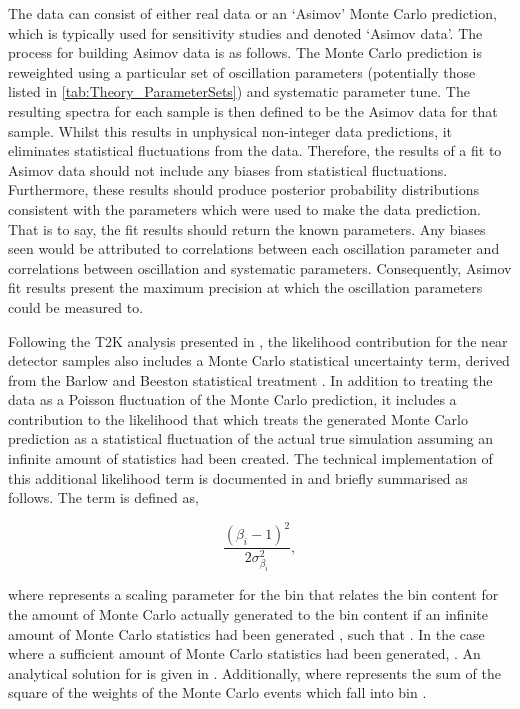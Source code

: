 The data can consist of either real data or an `Asimov' Monte Carlo prediction, which is typically used for sensitivity studies and denoted `Asimov data'. The process for building Asimov data is as follows. The Monte Carlo prediction is reweighted using a particular set of oscillation parameters (potentially those listed in \autoref{tab:Theory_ParameterSets}) and systematic parameter tune. The resulting spectra for each sample is then defined to be the Asimov data for that sample. Whilst this results in unphysical non-integer data predictions, it eliminates statistical fluctuations from the data. Therefore, the results of a fit to Asimov data should not include any biases from statistical fluctuations. Furthermore, these results should produce posterior probability distributions consistent with the parameters which were used to make the data prediction. That is to say, the fit results should return the known parameters. Any biases seen would be attributed to correlations between each oscillation parameter and correlations between oscillation and systematic parameters. Consequently, Asimov fit results present the maximum precision at which the oscillation parameters could be measured to.

Following the T2K analysis presented in \cite{Dunne2020-uf}, the likelihood contribution for the near detector samples also includes a Monte Carlo statistical uncertainty term, derived from the Barlow and Beeston statistical treatment \cite{Barlow1993-cc, Conway2011-go}. In addition to treating the data as a Poisson fluctuation of the Monte Carlo prediction, it includes a contribution to the likelihood that which treats the generated Monte Carlo prediction as a statistical fluctuation of the actual true simulation assuming an infinite amount of statistics had been created. The technical implementation of this additional likelihood term is documented in \cite{t2k_tn_395} and briefly summarised as follows. The term is defined as,

\begin{equation}
  \frac{(\beta_{i}-1)^{2}}{2\sigma^{2}_{\beta_{i}}},
\end{equation}

where  represents a scaling parameter for the  bin that relates the bin content for the amount of Monte Carlo actually generated  to the bin content if an infinite amount of Monte Carlo statistics had been generated , such that . In the case where a sufficient amount of Monte Carlo statistics had been generated, . An analytical solution for  is given in \cite{t2k_tn_395}. Additionally,  where  represents the sum of the square of the weights of the Monte Carlo events which fall into bin .

